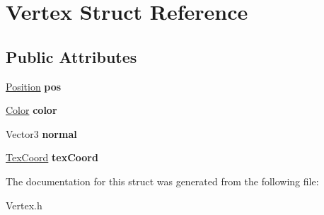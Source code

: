 \hypertarget{struct_vertex}{\section{Vertex Struct Reference}
\label{struct_vertex}
}
\subsection*{Public Attributes}
\begin{DoxyCompactItemize}
\item 
\hypertarget{struct_vertex_a8791e77df49f6996a19a8dd17cee8d5c}{\hyperlink{struct_position}{Position} {\bfseries pos}}\label{struct_vertex_a8791e77df49f6996a19a8dd17cee8d5c}

\item 
\hypertarget{struct_vertex_a3a3ff3f6cf46b1848795991e8159b922}{\hyperlink{struct_color}{Color} {\bfseries color}}\label{struct_vertex_a3a3ff3f6cf46b1848795991e8159b922}

\item 
\hypertarget{struct_vertex_adce2d4b3d1191c69328519bdf231c344}{Vector3 {\bfseries normal}}\label{struct_vertex_adce2d4b3d1191c69328519bdf231c344}

\item 
\hypertarget{struct_vertex_a717d827da388b9c4847d1f5343959c78}{\hyperlink{struct_tex_coord}{Tex\+Coord} {\bfseries tex\+Coord}}\label{struct_vertex_a717d827da388b9c4847d1f5343959c78}

\end{DoxyCompactItemize}


The documentation for this struct was generated from the following file\+:\begin{DoxyCompactItemize}
\item 
Vertex.\+h\end{DoxyCompactItemize}
